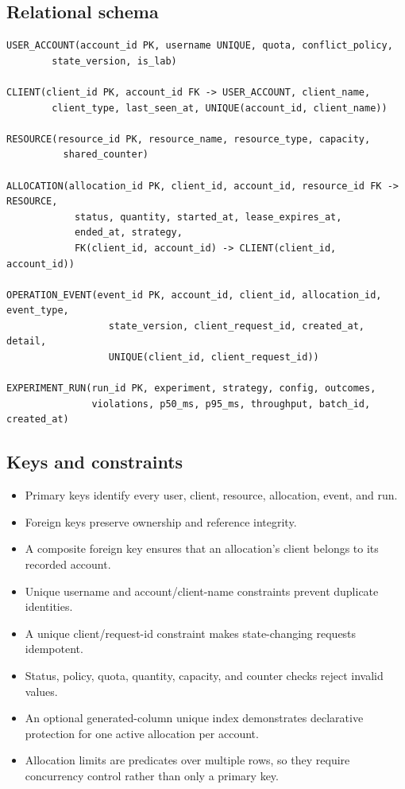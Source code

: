 \documentclass[12pt,a4paper]{article}
\begin{document}
\subsection{Relational schema}

\begin{lstlisting}
USER_ACCOUNT(account_id PK, username UNIQUE, quota, conflict_policy,
        state_version, is_lab)

CLIENT(client_id PK, account_id FK -> USER_ACCOUNT, client_name,
        client_type, last_seen_at, UNIQUE(account_id, client_name))

RESOURCE(resource_id PK, resource_name, resource_type, capacity,
          shared_counter)

ALLOCATION(allocation_id PK, client_id, account_id, resource_id FK -> RESOURCE,
            status, quantity, started_at, lease_expires_at,
            ended_at, strategy,
            FK(client_id, account_id) -> CLIENT(client_id, account_id))

OPERATION_EVENT(event_id PK, account_id, client_id, allocation_id, event_type,
                  state_version, client_request_id, created_at, detail,
                  UNIQUE(client_id, client_request_id))

EXPERIMENT_RUN(run_id PK, experiment, strategy, config, outcomes,
               violations, p50_ms, p95_ms, throughput, batch_id, created_at)
\end{lstlisting}

\subsection{Keys and constraints}
\begin{itemize}
\item Primary keys identify every user, client, resource, allocation, event, and run.
\item Foreign keys preserve ownership and reference integrity.
\item A composite foreign key ensures that an allocation's client belongs to its recorded account.
\item Unique username and account/client-name constraints prevent duplicate identities.
\item A unique client/request-id constraint makes state-changing requests idempotent.
\item Status, policy, quota, quantity, capacity, and counter checks reject invalid values.
\item An optional generated-column unique index demonstrates declarative protection for one active allocation per account.
\item Allocation limits are predicates over multiple rows, so they require concurrency control rather than only a primary key.
\end{itemize}
\end{document}
